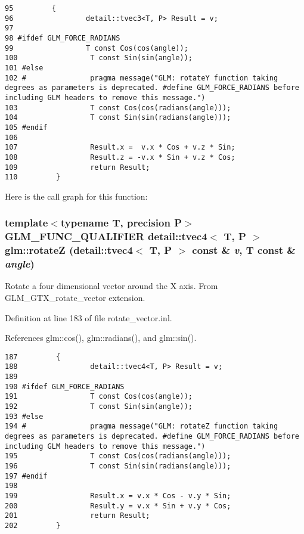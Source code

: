 \begin{Code}\begin{verbatim}95         {
96                 detail::tvec3<T, P> Result = v;
97 
98 #ifdef GLM_FORCE_RADIANS
99                 T const Cos(cos(angle));
100                 T const Sin(sin(angle));
101 #else
102 #               pragma message("GLM: rotateY function taking degrees as parameters is deprecated. #define GLM_FORCE_RADIANS before including GLM headers to remove this message.")
103                 T const Cos(cos(radians(angle)));
104                 T const Sin(sin(radians(angle)));
105 #endif
106 
107                 Result.x =  v.x * Cos + v.z * Sin;
108                 Result.z = -v.x * Sin + v.z * Cos;
109                 return Result;
110         }
\end{verbatim}
\end{Code}




Here is the call graph for this function:\hypertarget{group__gtx__rotate__vector_g4505b3c64cf26afba934ad1f65c5f792}{
\subsubsection[rotateZ]{\setlength{\rightskip}{0pt plus 5cm}template$<$typename T, precision P$>$ GLM\_\-FUNC\_\-QUALIFIER detail::tvec4$<$ T, P $>$ glm::rotateZ (detail::tvec4$<$ T, P $>$ const \& {\em v}, \/  T const \& {\em angle})}}
\label{group__gtx__rotate__vector_g4505b3c64cf26afba934ad1f65c5f792}


Rotate a four dimensional vector around the X axis. From GLM\_\-GTX\_\-rotate\_\-vector extension. 

Definition at line 183 of file rotate\_\-vector.inl.

References glm::cos(), glm::radians(), and glm::sin().

\begin{Code}\begin{verbatim}187         {
188                 detail::tvec4<T, P> Result = v;
189 
190 #ifdef GLM_FORCE_RADIANS
191                 T const Cos(cos(angle));
192                 T const Sin(sin(angle));
193 #else
194 #               pragma message("GLM: rotateZ function taking degrees as parameters is deprecated. #define GLM_FORCE_RADIANS before including GLM headers to remove this message.")
195                 T const Cos(cos(radians(angle)));
196                 T const Sin(sin(radians(angle)));
197 #endif
198 
199                 Result.x = v.x * Cos - v.y * Sin;
200                 Result.y = v.x * Sin + v.y * Cos;
201                 return Result;
202         }
\end{verbatim}
\end{Code}




